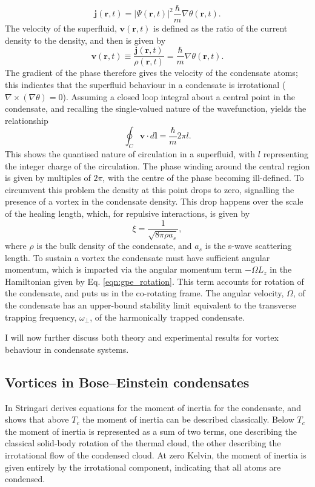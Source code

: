 \begin{equation}
\textbf{j}(\textbf{r},t) = \vert\Psi(\textbf{r},t)\vert ^2\frac{\hbar}{m}\nabla\theta(\textbf{r},t).
\end{equation}
The velocity of the superfluid, $\textbf{v}(\textbf{r},t)$ is defined as the ratio of the current density to the density, and then is given by
\begin{equation}\label{eqn:velocity}
\textbf{v}(\textbf{r},t)\equiv \frac{\textbf{j}(\textbf{r},t)}{\rho(\textbf{r},t)} = \frac{\hbar}{m}\nabla\theta(\textbf{r},t).
\end{equation}
The gradient of the phase therefore gives the velocity of the condensate atoms; this indicates that the superfluid behaviour in a condensate is irrotational ($\nabla\times(\nabla\theta) =0$). Assuming a closed loop integral about a central point in the condensate, and recalling the single-valued nature of the wavefunction, yields the relationship
\begin{equation}\label{eqn:circulation}
\oint_C \textbf{v}\cdot d\textbf{l} = \frac{\hbar}{m}2\pi l.
\end{equation}
This shows the quantised nature of circulation in a superfluid, with $l$ representing the integer charge of the circulation. The phase winding around the central region is given by multiples of $2\pi$, with the centre of the phase becoming ill-defined. To circumvent this problem the density at this point drops to zero, signalling the presence of a vortex in the condensate density. This drop happens over the scale of the healing length, which, for repulsive interactions, is given by
\begin{equation}
\xi = \frac{1}{\sqrt{8\pi \rho a_s}},
\end{equation}
where $\rho$ is the bulk density of the condensate, and $a_s$ is the s-wave scattering length.
To sustain a vortex the condensate must have sufficient angular momentum, which is imparted via the angular momentum term $-\Omega L_z$
in the Hamiltonian given by Eq. \eqref{eqn:gpe_rotation}. This term accounts for rotation of the condensate, and puts us in the co-rotating
frame. The angular velocity, $\Omega$, of the condensate has an upper-bound stability limit equivalent to the transverse trapping frequency, $\omega_{\perp}$, of the harmonically trapped condensate.

I will now further discuss both theory and experimental results for vortex behaviour in condensate systems.

\subsection{Vortices in Bose--Einstein condensates}\label{ss:vorticesinbec}
In \cite{BEC:Stringari_prl_1996} Stringari derives equations for the moment of inertia for the condensate, and shows that above $T_c$ the moment of inertia can be described classically. Below $T_c$ the moment of inertia is represented as a sum of two terms, one describing the classical solid-body rotation of the thermal cloud, the other describing the irrotational flow of the condensed cloud.  At zero Kelvin, the moment of inertia is given entirely by the irrotational component, indicating that all atoms are condensed.

